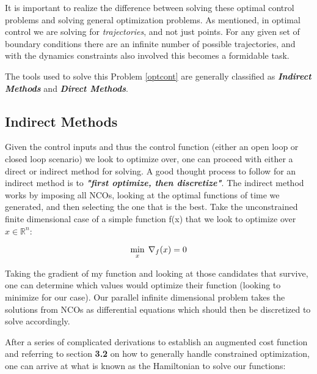 \documentclass[twoside]{article}
\begin{document}
It is important to realize the difference between solving these optimal control problems and solving general optimization problems. As mentioned, in optimal control we are solving for \textit{trajectories}, and not just points. For any given set of boundary conditions there are an infinite number of possible trajectories, and with the dynamics constraints also involved this becomes a formidable task.

The tools used to solve this Problem \ref{optcont} are generally classified as \textit{\textbf{Indirect Methods}} and \textit{\textbf{Direct Methods}}.



\subsection{Indirect Methods}

Given the control inputs and thus the control function (either an open loop or closed loop scenario) we look to optimize over, one can proceed with either a direct or indirect method for solving. A good thought process to follow for an indirect method is to \textit{\textbf{"first optimize, then discretize"}}. The indirect method works by imposing all NCOs, looking at the optimal functions of time we generated, and then selecting the one that is the best. Take the unconstrained finite dimensional case of a simple function f(x) that we look to optimize over $x \in \mathbb{R}^n$:

$$\underset{x}{\text{min}} \:\: \nabla_f(x) = 0 \\$$

Taking the gradient of my function and looking at those candidates that survive, one can determine which values would optimize their function (looking to minimize for our case). Our parallel infinite dimensional problem takes the solutions from NCOs as differential equations which should then be discretized to solve accordingly.

After a series of complicated derivations to establish an augmented cost function and referring to section \textbf{3.2} on how to generally handle constrained optimization, one can arrive at what is known as the Hamiltonian to solve our functions:
\end{document}
